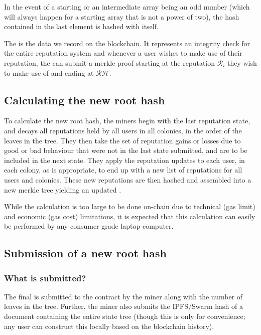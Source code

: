 In the event of a starting or an intermediate array being an odd number (which will always happen for a starting array that is not a power of two), the hash contained in the last element is hashed with itself.

The  is the data we record on the blockchain. It represents an integrity check for the entire reputation system and whenever a user wishes to make use of their reputation, the can submit a merkle proof starting at the reputation $\mathcal{R}_i$ they wish to make use of and ending at $\mathcal{RH}$.

\subsection{Calculating the new root hash}
To calculate the new root hash, the miners begin with the last reputation state, and decays all reputations held by all users in all colonies, in the order of the leaves in the tree. They then take the set of reputation gains or losses due to good or bad behaviour that were not in the last state submitted, and are to be included in the next state. They apply the reputation updates to each user, in each colony, as is appropriate, to end up with a new list of reputations for all users and colonies. These new reputations are then hashed and assembled into a new merkle tree yielding an updated .

While the calculation is too large to be done on-chain due to technical (gas limit) and economic (gas cost) limitations, it is expected that this calculation can easily be performed by any consumer grade laptop computer.

\subsection{Submission of a new root hash}
%
\subsubsection*{What is submitted?}
The final  is submitted to the contract by the miner along with the number of leaves in the tree. Further, the miner also submits the IPFS/Swarm hash of a document containing the entire state tree (though this is only for convenience; any user can construct this locally based on the blockchain history).
%
